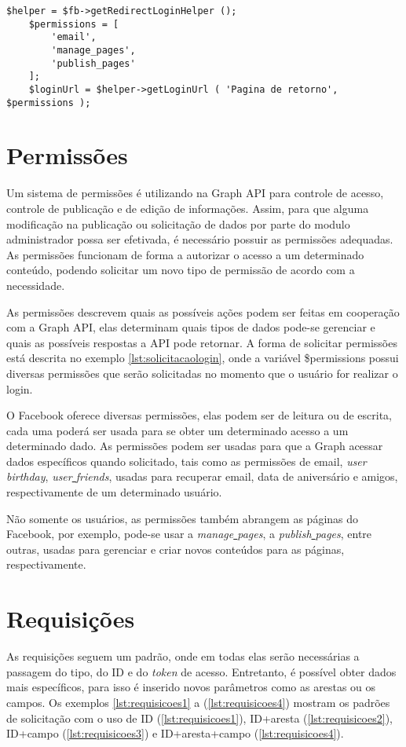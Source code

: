 \begin{lstlisting}[caption={Solicitação de Login},label={lst:solicitacaologin}]
	$helper = $fb->getRedirectLoginHelper ();
	$permissions = [
		'email',
		'manage_pages',
		'publish_pages'
	];
	$loginUrl = $helper->getLoginUrl ( 'Pagina de retorno', $permissions );
\end{lstlisting}

\section{Permissões}
\label{sec:permissoes}
Um sistema de permissões é utilizando na Graph API para controle de acesso, controle de publicação e de edição de informações. Assim, para que alguma modificação na publicação ou solicitação de dados por parte do modulo administrador possa ser efetivada, é necessário possuir as permissões adequadas. As permissões funcionam de forma a autorizar o acesso a um determinado conteúdo, podendo solicitar um novo tipo de permissão de acordo com a necessidade.

As permissões descrevem quais as possíveis ações podem ser feitas em cooperação com a Graph API, elas determinam quais tipos de dados pode-se gerenciar e quais as possíveis respostas a API pode retornar. A forma de solicitar permissões está descrita no exemplo \ref{lst:solicitacaologin}, onde a variável \$permissions possui diversas permissões que serão solicitadas no momento que o usuário for realizar o login.

O Facebook oferece diversas permissões, elas podem ser de leitura ou de escrita, cada uma poderá ser usada para se obter um determinado acesso a um determinado dado. As permissões podem ser usadas para que a Graph acessar dados específicos quando solicitado, tais como as permissões de email, \textit{user\underline{{ }}birthday}, \textit{user\underline{{ }}friends}, usadas para recuperar email, data de aniversário e amigos, respectivamente de um determinado usuário.

Não somente os usuários, as permissões também abrangem as páginas do Facebook, por exemplo, pode-se usar a \textit{manage\underline{{ }}pages}, a \textit{publish\underline{{ }}pages}, entre outras, usadas para gerenciar e criar novos conteúdos para as páginas, respectivamente.

\section{Requisições}
As requisições seguem um padrão, onde em todas elas serão necessárias a passagem do tipo, do ID e do \textit{token} de acesso. Entretanto, é possível obter dados mais específicos, para isso é inserido novos parâmetros como as arestas ou os campos. Os exemplos  \ref{lst:requisicoes1} a  (\ref{lst:requisicoes4}) mostram os padrões de solicitação com o uso de ID (\ref{lst:requisicoes1}), ID+aresta (\ref{lst:requisicoes2}), ID+campo (\ref{lst:requisicoes3}) e ID+aresta+campo (\ref{lst:requisicoes4}).

